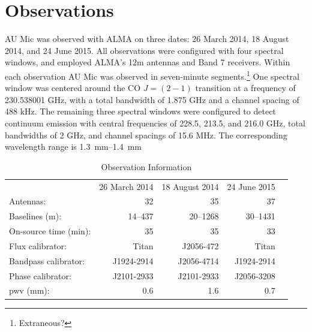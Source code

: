 \documentclass[12pt,oneside]{book}
\begin{document}
% 
% 
% 
\mainmatter 
% 

\chapter{Observations}
AU Mic was observed  with ALMA on three dates: 26 March 2014, 18 August 2014, and 24 June 2015. 
All observations were configured with four spectral windows, and employed ALMA's 12m antennas and Band 7 receivers. 
Within each observation AU Mic was observed in seven-minute segments.\footnote{Extraneous?}
One spectral window was centered around the CO $J = (2-1)$ transition at a frequency of 230.538001 GHz, with a total bandwidth of 1.875 GHz and a channel spacing of 488 kHz.
The remaining three spectral windows were configured to detect continuum emission with central frequencies of 228.5, 213.5, and 216.0 GHz, total bandwidths of 2 GHz, and channel spacings of 15.6 MHz. The corresponding wavelength range is \SIrange{1.3}{1.4}{\mm}

\begin{table}	
  \centering
	\caption{Observation Information}
  \label{tab:observations}
  \begin{tabular}{lrrrr}
    \toprule
    & 26 March 2014 & 18 August 2014 & 24 June 2015 \\
    \cmidrule(lr){2-4}
    Antennas: & 32 & 35 & 37 \\
    Baselines (m): & 14--437 & 20--1268 & 30--1431 \\
    On-source time (min): & 35 & 35 & 33 \\
    Flux calibrator: & Titan & J2056-472 & Titan \\
    Bandpass calibrator: & J1924-2914 & J2056-4714 & J1924-2914 \\
    Phase calibrator: & J2101-2933 & J2101-2933 & J2056-3208  \\
    pwv (mm): & 0.6 & 1.6 & 0.7 \\
    \bottomrule
  \end{tabular}
\end{table}
\end{document}
